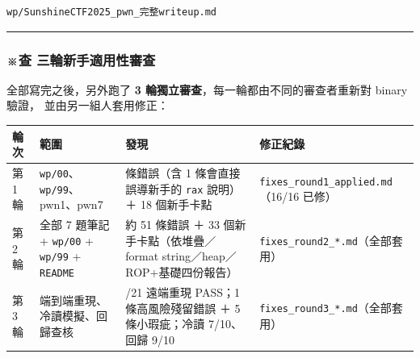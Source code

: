\documentclass[10pt,a4paper]{article}
\newcounter{none}
\begin{document}
\begin{Verbatim}[breaklines=true,breakanywhere=true,breakautoindent=false,fontsize=\fontsize{7.0}{9.5}\selectfont]
wp/SunshineCTF2025_pwn_完整writeup.md
\end{Verbatim}

\begin{center}\rule{0.5\linewidth}{0.5pt}\end{center}

\subsubsection{※查
三輪新手適用性審查}\label{ux67e5-ux4e09ux8f2aux65b0ux624bux9069ux7528ux6027ux5be9ux67e5}

全部寫完之後，另外跑了 \textbf{3
輪獨立審查}，每一輪都由不同的審查者重新對 binary 驗證，
並由另一組人套用修正：

{\def\LTcaptype{none} %
\begin{longtable}[]{@{}
  >{\raggedright\arraybackslash}p{}
  >{\raggedright\arraybackslash}p{}
  >{\raggedright\arraybackslash}p{}
  >{\raggedright\arraybackslash}p{}@{}}
\toprule\noalign{}
\begin{minipage}[b]{\linewidth}\raggedright
輪次
\end{minipage} & \begin{minipage}[b]{\linewidth}\raggedright
範圍
\end{minipage} & \begin{minipage}[b]{\linewidth}\raggedright
發現
\end{minipage} & \begin{minipage}[b]{\linewidth}\raggedright
修正紀錄
\end{minipage} \\
\midrule\noalign{}
\endhead
\bottomrule\noalign{}
\endlastfoot
第 1 輪 & \texttt{wp/\allowbreak{}00}、\texttt{wp/\allowbreak{}99}、pwn1、pwn7 & 16 條錯誤（含 1
條會直接誤導新手的 \texttt{rax} 說明）＋ 18 個新手卡點 &
\texttt{fixes\_\allowbreak{}round1\_\allowbreak{}applied.\allowbreak{}md}（16/16 已修） \\
第 2 輪 & 全部 7 題筆記 + \texttt{wp/\allowbreak{}00} + \texttt{wp/\allowbreak{}99} +
\texttt{README} & 約 51 條錯誤 ＋ 33 個新手卡點（依堆疊／format
string／heap／ROP+基礎四份報告） &
\texttt{fixes\_\allowbreak{}round2\_\allowbreak{}*.\allowbreak{}md}（全部套用） \\
第 3 輪 & 端到端重現、冷讀模擬、回歸查核 & 21/21 遠端重現 PASS；1
條高風險殘留錯誤 ＋ 5 條小瑕疵；冷讀 7/10、回歸 9/10 &
\texttt{fixes\_\allowbreak{}round3\_\allowbreak{}*.\allowbreak{}md}（全部套用） \\
\end{longtable}
}
\end{document}
